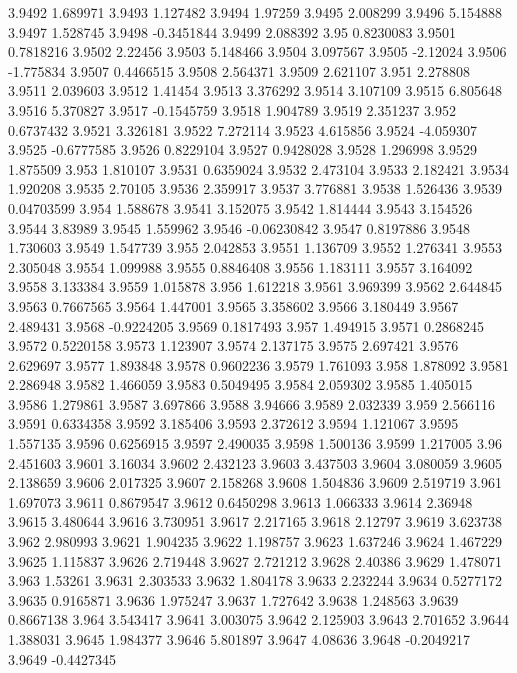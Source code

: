 3.9492  1.689971
3.9493  1.127482
3.9494  1.97259
3.9495  2.008299
3.9496  5.154888
3.9497  1.528745
3.9498  -0.3451844
3.9499  2.088392
3.95  0.8230083
3.9501  0.7818216
3.9502  2.22456
3.9503  5.148466
3.9504  3.097567
3.9505  -2.12024
3.9506  -1.775834
3.9507  0.4466515
3.9508  2.564371
3.9509  2.621107
3.951  2.278808
3.9511  2.039603
3.9512  1.41454
3.9513  3.376292
3.9514  3.107109
3.9515  6.805648
3.9516  5.370827
3.9517  -0.1545759
3.9518  1.904789
3.9519  2.351237
3.952  0.6737432
3.9521  3.326181
3.9522  7.272114
3.9523  4.615856
3.9524  -4.059307
3.9525  -0.6777585
3.9526  0.8229104
3.9527  0.9428028
3.9528  1.296998
3.9529  1.875509
3.953  1.810107
3.9531  0.6359024
3.9532  2.473104
3.9533  2.182421
3.9534  1.920208
3.9535  2.70105
3.9536  2.359917
3.9537  3.776881
3.9538  1.526436
3.9539  0.04703599
3.954  1.588678
3.9541  3.152075
3.9542  1.814444
3.9543  3.154526
3.9544  3.83989
3.9545  1.559962
3.9546  -0.06230842
3.9547  0.8197886
3.9548  1.730603
3.9549  1.547739
3.955  2.042853
3.9551  1.136709
3.9552  1.276341
3.9553  2.305048
3.9554  1.099988
3.9555  0.8846408
3.9556  1.183111
3.9557  3.164092
3.9558  3.133384
3.9559  1.015878
3.956  1.612218
3.9561  3.969399
3.9562  2.644845
3.9563  0.7667565
3.9564  1.447001
3.9565  3.358602
3.9566  3.180449
3.9567  2.489431
3.9568  -0.9224205
3.9569  0.1817493
3.957  1.494915
3.9571  0.2868245
3.9572  0.5220158
3.9573  1.123907
3.9574  2.137175
3.9575  2.697421
3.9576  2.629697
3.9577  1.893848
3.9578  0.9602236
3.9579  1.761093
3.958  1.878092
3.9581  2.286948
3.9582  1.466059
3.9583  0.5049495
3.9584  2.059302
3.9585  1.405015
3.9586  1.279861
3.9587  3.697866
3.9588  3.94666
3.9589  2.032339
3.959  2.566116
3.9591  0.6334358
3.9592  3.185406
3.9593  2.372612
3.9594  1.121067
3.9595  1.557135
3.9596  0.6256915
3.9597  2.490035
3.9598  1.500136
3.9599  1.217005
3.96  2.451603
3.9601  3.16034
3.9602  2.432123
3.9603  3.437503
3.9604  3.080059
3.9605  2.138659
3.9606  2.017325
3.9607  2.158268
3.9608  1.504836
3.9609  2.519719
3.961  1.697073
3.9611  0.8679547
3.9612  0.6450298
3.9613  1.066333
3.9614  2.36948
3.9615  3.480644
3.9616  3.730951
3.9617  2.217165
3.9618  2.12797
3.9619  3.623738
3.962  2.980993
3.9621  1.904235
3.9622  1.198757
3.9623  1.637246
3.9624  1.467229
3.9625  1.115837
3.9626  2.719448
3.9627  2.721212
3.9628  2.40386
3.9629  1.478071
3.963  1.53261
3.9631  2.303533
3.9632  1.804178
3.9633  2.232244
3.9634  0.5277172
3.9635  0.9165871
3.9636  1.975247
3.9637  1.727642
3.9638  1.248563
3.9639  0.8667138
3.964  3.543417
3.9641  3.003075
3.9642  2.125903
3.9643  2.701652
3.9644  1.388031
3.9645  1.984377
3.9646  5.801897
3.9647  4.08636
3.9648  -0.2049217
3.9649  -0.4427345
